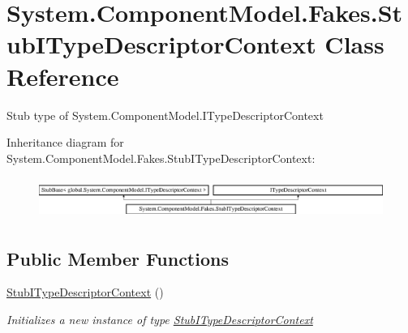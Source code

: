 \hypertarget{class_system_1_1_component_model_1_1_fakes_1_1_stub_i_type_descriptor_context}{\section{System.\-Component\-Model.\-Fakes.\-Stub\-I\-Type\-Descriptor\-Context Class Reference}
\label{class_system_1_1_component_model_1_1_fakes_1_1_stub_i_type_descriptor_context}
}


Stub type of System.\-Component\-Model.\-I\-Type\-Descriptor\-Context 


Inheritance diagram for System.\-Component\-Model.\-Fakes.\-Stub\-I\-Type\-Descriptor\-Context\-:\begin{figure}[H]
\begin{center}
\leavevmode
\includegraphics[height=1.355932cm]{class_system_1_1_component_model_1_1_fakes_1_1_stub_i_type_descriptor_context}
\end{center}
\end{figure}
\subsection*{Public Member Functions}
\begin{DoxyCompactItemize}
\item 
\hyperlink{class_system_1_1_component_model_1_1_fakes_1_1_stub_i_type_descriptor_context_a711da34d7ac376e75b51651167df458a}{Stub\-I\-Type\-Descriptor\-Context} ()
\begin{DoxyCompactList}\small\item\em Initializes a new instance of type \hyperlink{class_system_1_1_component_model_1_1_fakes_1_1_stub_i_type_descriptor_context}{Stub\-I\-Type\-Descriptor\-Context}\end{DoxyCompactList}\end{DoxyCompactItemize}
